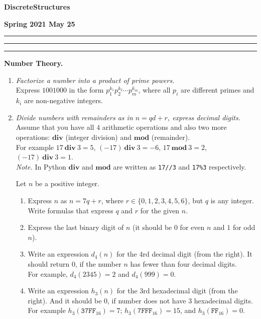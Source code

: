 \documentclass[a4paper,12pt]{article}
\begin{document}
\begin{center}
\parbox{3cm}{\flushleft\bf Discrete\linebreak Structures}
\hfill
\parbox{7cm}{}
\hfill
\parbox{3cm}{\flushright\bf Spring 2021 \linebreak May 25}
\end{center}

\hrule\vspace{2pt}\hrule

\hrule



\vspace{10pt}
{\bf Number Theory.}

\begin{enumerate}

\item {\small \em
Factorize a number into a product of prime powers.}\\
Express $1001000$ in the form $p_1^{k_1} p_2^{k_2} \cdots p_m^{k_m}$,
where all $p_i$ are different primes and $k_i$ are non-negative integers.


\item {\small \em
Divide numbers with remainders as in $n = qd + r$, express decimal digits.}\\
Assume that you have all $4$ arithmetic operations and also two
more operations: $\mathbf{div}$ (integer division) and $\mathbf{mod}$
(remainder).\\
For example $17\ \mathbf{div}\ 3 = 5$,
$(-17)\ \mathbf{div}\ 3 = -6$, $17\ \mathbf{mod}\ 3 = 2$,
$(-17)\ \mathbf{div}\ 3 = 1$.\\
{\em Note.} In Python $\mathbf{div}$ and $\mathbf{mod}$  are
written as {\tt 17//3} and {\tt 17\%3} respectively.

Let $n$ be a positive integer.
\begin{enumerate}
\item Express $n$ as $n = 7q + r$, where $r \in \{ 0,1,2,3,4,5,6 \}$,
but $q$ is any integer. Write formulas that express $q$ and $r$ for the given $n$.
\item Express the last binary digit of $n$ (it should be $0$ for even $n$
and $1$ for odd $n$).
\item
Write an expression $d_4(n)$ for the
4rd decimal digit (from the right). It should return $0$, if the number
$n$ has fewer than four decimal digits.\\
For example, $d_4(2345) = 2$
and $d_4(999) = 0$.
\item
Write an expression $h_3(n)$ for the 3rd hexadecimal digit (from the right).
And it should be $0$, if number does not have $3$ hexadecimal digits.\\
For example $h_3(\mathtt{37FF}_{16}) =7$; $h_3(\mathtt{7FFF}_{16}) = 15$,
and $h_3(\mathtt{FF}_{16}) = 0$.
\end{enumerate}


\end{enumerate}
\end{document}
